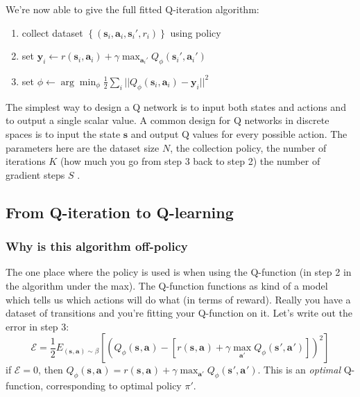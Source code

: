 \documentclass{report}
\newcommand{\argmin}{\arg\!\min}
\begin{document}
We're now able to give the full fitted Q-iteration algorithm:
\begin{enumerate}
		\label{eq:fitted_q_iteration_algorithm}
		\item collect dataset $ \left\{ \left( \bm{s}_i, \bm{a}_i, \bm{s}_i', r_i \right)  \right\}  $ using policy
		\item set $ \bm{y}_i \leftarrow r(\bm{s}_{i}, \bm{a}_{i})+ \gamma \max_{\bm{a}_i'} Q_\phi (\bm{s}_{i}', \bm{a}_{i}')   $
		\item set $\phi \leftarrow \argmin_\phi \frac{1}{2} \sum_{i}^{} || Q_\phi (\bm{s}_{i}, \bm{a}_{i}) - \bm{y}_i||^2 $
\end{enumerate}
The simplest way to design a Q network is to input both states and actions and to output a single scalar value.
A common design for Q networks in discrete spaces is to input the state $\bm{s}$ and output Q values for every possible action.
The parameters here are the dataset size $N$, the collection policy, 
the number of iterations $K$ (how much you go from step 3 back to step 2) the number of gradient steps $S$ .

\subsection{From Q-iteration to Q-learning}
\subsubsection{Why is this algorithm off-policy}
The one place where the policy is used is when using the Q-function (in step 2 in the algorithm under the max).
The Q-function functions as kind of a model which tells us which actions will do what (in terms of reward).
Really you have a dataset of transitions and you're fitting your Q-function on it.
Let's write out the error in step 3:
\begin{equation}
		\mathcal{E} = \frac{1}{2} E_{(\bm{s}_{}, \bm{a}_{}) \sim \beta}
		\left[ \left( Q_\phi (\bm{s}_{}, \bm{a}_{}) - \left[ r(\bm{s}_{}, \bm{a}_{}) + \gamma \max_{\bm{a}'}Q_\phi(\bm{s}_{}', \bm{a}_{}')  \right]  \right)^2  \right] 
\end{equation}
if $\mathcal{E} =0 $, then $ Q_\phi(\bm{s}_{}, \bm{a}_{}) = r(\bm{s}_{}, \bm{a}_{}) + \gamma \max_{\bm{a}'}Q_\phi(\bm{s}_{}', \bm{a}_{}')$.
This is an \textit{optimal} Q-function, corresponding to optimal policy $\pi'$.
\end{document}
